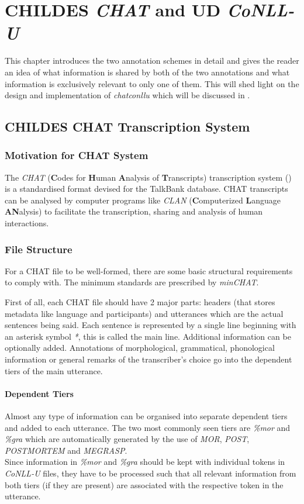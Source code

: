 \chapter{CHILDES \emph{CHAT} and UD \emph{CoNLL-U}} %

\label{Chapter2} %

This chapter introduces the two annotation schemes in detail and gives the
reader an idea of what information is shared by both of the two annotations and
what information is exclusively relevant to only one of them. This will shed
light on the design and implementation of \emph{chatconllu} which will be
discussed in .

\section{CHILDES CHAT Transcription System}
\subsection{Motivation for CHAT System}
The \emph{CHAT} (\textbf{C}odes for \textbf{H}uman \textbf{A}nalysis of
\textbf{T}ranscripts) transcription system (\cite{Macwhinney2000}) is a
standardised format devised for the TalkBank database. CHAT transcripts
can be analysed by computer programs like \emph{CLAN} (\textbf{C}omputerized
\textbf{L}anguage \textbf{AN}alysis) to facilitate the transcription, sharing
and analysis of human interactions.

\subsection{File Structure}
For a CHAT file to be well-formed, there are some basic structural
requirements to comply with. The minimum standards are prescribed by
\emph{minCHAT}.

First of all, each CHAT file should have 2 major parts: headers (that
stores metadata like language and participants) and utterances which are the
actual sentences being said. Each sentence is represented by a single line
beginning with an asterisk symbol \emph{*}, this is called the main line.
Additional information can be optionally added. Annotations of morphological,
grammatical, phonological information or general remarks of the transcriber's
choice go into the dependent tiers of the main utterance.
\subsubsection{Dependent Tiers}
Almost any type of information can be organised into separate dependent tiers
and added to each utterance. The two most commonly seen tiers are \emph{\%mor}
and \emph{\%gra} which are automatically generated by the use of \emph{MOR},
\emph{POST}, \emph{POSTMORTEM} and \emph{MEGRASP}.\\
Since information in \emph{\%mor} and \emph{\%gra} should be kept with
individual tokens in \emph{CoNLL-U} files, they have to be processed such that
all relevant information from both tiers (if they are present) are associated
with the respective token in the utterance.
